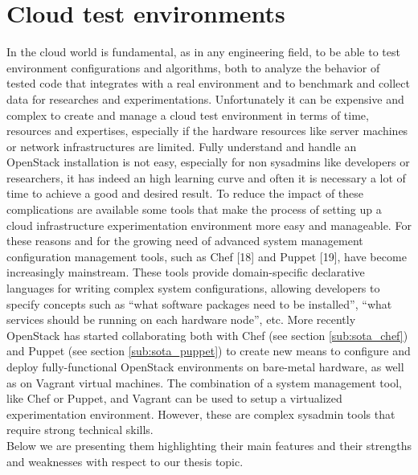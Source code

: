 \section{Cloud test environments}
\label{sec:sota_test_env}

In the cloud world is fundamental, as in any engineering field, to be able to test environment configurations and algorithms, both to analyze the behavior of tested code that integrates with a real environment and to benchmark and collect data for researches and experimentations. Unfortunately it can be expensive and complex to create and manage a cloud test environment in terms of time, resources and expertises, especially if the hardware resources like server machines or network infrastructures are limited. Fully understand and handle an OpenStack installation is not easy, especially for non sysadmins  like developers or researchers, it has indeed an high learning curve and often it is necessary a lot of time to achieve a good and desired result.
To reduce the impact of these complications are available some tools that make the process of setting up a cloud infrastructure experimentation environment more easy and manageable.
For these reasons and for the growing need of advanced system management configuration management tools, such as Chef [18] and Puppet [19], have become increasingly mainstream. These tools provide domain-specific declarative languages for writing complex system configurations, allowing developers to specify concepts such as ``what software packages need to be installed'', ``what services should be running on each hardware node'', etc. More recently OpenStack has started collaborating both with Chef (see section \ref{sub:sota_chef}) and Puppet (see section \ref{sub:sota_puppet}) to create new means to configure and deploy fully-functional OpenStack environments on bare-metal hardware, as well as on Vagrant virtual machines. The combination of a system management tool, like Chef or Puppet, and Vagrant can be used to setup a virtualized experimentation environment. However, these are complex sysadmin tools that require strong technical skills.\\
Below we are presenting them highlighting their main features and their strengths and weaknesses with respect to our thesis topic.


